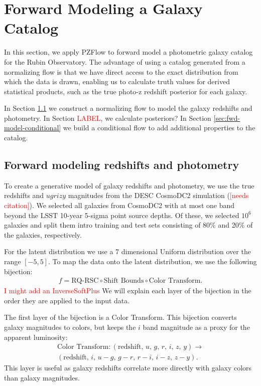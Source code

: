 \documentclass[twocolumn]{aastex631}
\newcommand{\note}[1]{\textsf{\textcolor{red}{#1}}}
\newcommand{\needscite}{\note{[needs citation]}}
\begin{document}
\section{Forward Modeling a Galaxy Catalog}
\label{sec:galaxy-catalog}

In this section, we apply PZFlow to forward model a photometric galaxy catalog for the Rubin Observatory.
The advantage of using a catalog generated from a normalizing flow is that we have direct access to the exact distribution from which the data is drawn, enabling us to calculate truth values for derived statistical products, such as the true photo-z redshift posterior for each galaxy.

In Section \ref{sec:fwd-model} we construct a normalizing flow to model the galaxy redshifts and photometry.
In Section \note{LABEL}, we calculate posteriors?
In Section \ref{sec:fwd-model-conditional} we build a conditional flow to add additional properties to the catalog.

\subsection{Forward modeling redshifts and photometry}
\label{sec:fwd-model}

To create a generative model of galaxy redshifts and photometry, we use the true redshifts and $ugrizy$ magnitudes from the DESC CosmoDC2 simulation (\needscite).
We selected all galaxies from CosmoDC2 with at most one band beyond the LSST 10-year 5-sigma point source depths.
Of these, we selected $10^6$ galaxies and split them intro training and test sets consisting of 80\% and 20\% of the galaxies, respectively.

For the latent distribution we use a 7 dimensional Uniform distribution over the range $[-5, 5]$.
To map the data onto the latent distribution, we use the following bijection:
\begin{align}
    f = \text{RQ-RSC} \circ \text{Shift Bounds} \circ \text{Color Transform}.
\end{align}
\note{I might add an InverseSoftPlus}
We will explain each layer of the bijection in the order they are applied to the input data.

The first layer of the bijection is a Color Transform.
This bijection converts galaxy magnitudes to colors, but keeps the $i$ band magnitude as a proxy for the apparent luminosity:
\begin{multline}
    \text{Color Transform} : (\text{redshift},\, u,\, g,\, r,\, i,\, z,\, y) \to \\
    (\text{redshift},\, i,\, u-g,\, g-r,\, r-i,\, i-z,\, z-y).
\end{multline}
This layer is useful as galaxy redshifts correlate more directly with galaxy colors than galaxy magnitudes.
\end{document}
